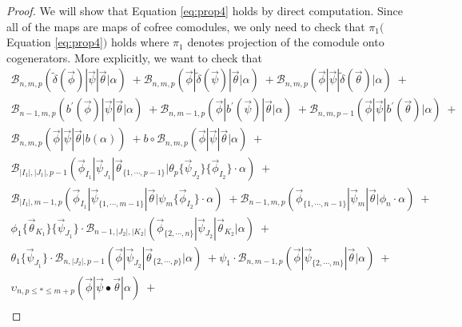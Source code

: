 \begin{proof}
We will show that Equation \ref{eq:prop4} 
holds by direct computation. Since all of 
the maps are maps of cofree comodules, we 
only need to check that $\pi_1($
Equation \ref{eq:prop4}$)$ holds where 
$\pi_1$ denotes projection of the comodule 
onto cogenerators. More explicitly, we 
want to check that
\begin{equation} \label{eq:prop4_expand}
\begin{aligned}
\mathcal{B}_{n, m, p} ( \tilde{\delta}(\vec{\phi}) | \vec{\psi} | \vec{\theta} | \alpha ) \; + 
\mathcal{B}_{n, m, p} ( \vec{\phi} | \tilde{\delta}(\vec{\psi}) | \vec{\theta} | \alpha ) \; + 
\mathcal{B}_{n, m, p} ( \vec{\phi} | \vec{\psi} | \tilde{\delta}(\vec{\theta}) | \alpha ) \; + \\
\mathcal{B}_{n-1, m, p} ( b^\prime(\vec{\phi}) | \vec{\psi} | \vec{\theta} | \alpha ) \; + 
\mathcal{B}_{n, m-1, p} ( \vec{\phi} | b^\prime(\vec{\psi}) | \vec{\theta} | \alpha ) \; + 
\mathcal{B}_{n, m, p-1} ( \vec{\phi} | \vec{\psi} | b^\prime(\vec{\theta}) | \alpha ) \; + \\
\mathcal{B}_{n, m, p} ( \vec{\phi} | \vec{\psi} | \vec{\theta} | b(\alpha) ) \; + 
b \circ \mathcal{B}_{n, m, p} ( \vec{\phi} | \vec{\psi} | \vec{\theta} | \alpha ) \; + \\
 \mathcal{B}_{|I_1|, |J_1|, p-1}(\vec{\phi}_{I_1} | \vec{\psi}_{J_1} | \vec{\theta}_{\{1,\cdots, p-1\}} |
     \theta_{p} \{\vec{\psi}_{J_2}\} \{\vec{\phi}_{I_2}\} \cdot \alpha ) \; + \\
 \mathcal{B}_{|I_1|, m-1, p}(\vec{\phi}_{I_1} | \vec{\psi}_{\{1,\cdots, m-1\}} | \vec{\theta} |
     \psi_{m} \{\vec{\phi}_{I_2}\}\cdot \alpha ) \; + 
\mathcal{B}_{n-1, m, p}(\vec{\phi}_{\{1,\cdots, n-1\}} |\vec{\psi}_{m} | \vec{\theta} | 
     \phi_{n} \cdot \alpha) \; + \\
\phi_1 \{\vec{\theta}_{K_1}\} \{\vec{\psi}_{J_1}\} \cdot
     \mathcal{B}_{n-1, |J_2|, |K_2|}
     (\vec{\phi}_{\{2,\cdots,n\}} | \vec{\psi}_{J_2} | \vec{\theta}_{K_2} | \alpha) \; + \\
\theta_1 \{\vec{\psi}_{J_1}\} \cdot
     \mathcal{B}_{n, |J_2|, p-1}
     (\vec{\phi} | \vec{\psi}_{J_2} | \vec{\theta}_{\{2,\cdots,p\}} | \alpha) \; +
\psi_1 \cdot
     \mathcal{B}_{n, m-1, p}
     (\vec{\phi} | \vec{\psi}_{\{2,\cdots,m\}} | \vec{\theta} | \alpha) \; + \\
\upsilon_{n, p \leq * \leq m+p}(\vec{\phi} | \vec{\psi} \bullet \vec{\theta} | \alpha ) \; + \\

\end{aligned}
\end{equation}
\end{proof}
